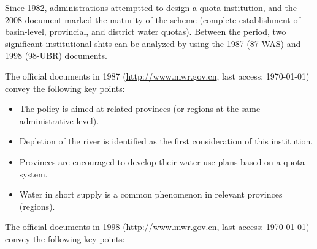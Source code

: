 \documentclass[default, sn-standardnature]{sn-jnl}
\begin{document}
Since 1982, administrations attemptted to design a quota institution, and the 2008 document marked the maturity of the scheme (complete establishment of basin-level, provincial, and district water quotas).
Between the period, two significant institutional shits can be analyzed by using the 1987 (87-WAS) and 1998 (98-UBR) documents.


The official documents in 1987 (\href{http://www.gov.cn/zhengce/content/2011-03/30/content_3138.htm#}{http://www.mwr.gov.cn}, last access: \today) convey the following key points:

\begin{itemize}
	\item The policy is aimed at related provinces (or regions at the same administrative level).
	\item Depletion of the river is identified as the first consideration of this institution.
	\item Provinces are encouraged to develop their water use plans based on a quota system.
	\item Water in short supply is a common phenomenon in relevant provinces (regions).
\end{itemize}

The official documents in 1998
(\href{http://www.mwr.gov.cn/ztpd/2013ztbd/2013fxkh/fxkhswcbcs/cs/flfg/201304/t20130411_433489.html}{http://www.mwr.gov.cn}, last access: \today) convey the following key points:
\end{document}
